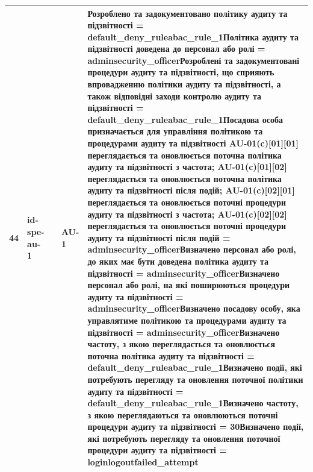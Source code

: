 \documentclass[10pt]{article}
\begin{document}
\begin{longtable}{|c|>{\raggedright\arraybackslash}p{2.5cm}|>{\raggedright\arraybackslash}p{4.5cm}|>{\raggedright\arraybackslash}p{3cm}|>{\raggedright\arraybackslash}p{4.5cm}|}
44 & id-spe-au-1 &  & AU-1 & Розроблено та задокументовано політику аудиту та підзвітності = \textbf{default\_\allowbreak{}deny\_\allowbreak{}ruleabac\_\allowbreak{}rule\_\allowbreak{}1}\newline Політика аудиту та підзвітності доведена до персонал або ролі = \textbf{adminsecurity\_\allowbreak{}officer}\newline Розроблені та задокументовані процедури аудиту та підзвітності, що сприяють впровадженню політики аудиту та підзвітності, а також відповідні заходи контролю аудиту та підзвітності = \textbf{default\_\allowbreak{}deny\_\allowbreak{}ruleabac\_\allowbreak{}rule\_\allowbreak{}1}\newline Посадова особа призначається для управління політикою та процедурами аудиту та підзвітності AU-01(c)[01][01] переглядається та оновлюється поточна політика аудиту та підзвітності з частота; AU-01(c)[01][02] переглядається та оновлюється поточна політика аудиту та підзвітності після подій; AU-01(c)[02][01] переглядається та оновлюється поточні процедури аудиту та підзвітності з частота; AU-01(c)[02][02] переглядається та оновлюється поточні процедури аудиту та підзвітності після подій = \textbf{adminsecurity\_\allowbreak{}officer}\newline Визначено персонал або ролі, до яких має бути доведена політика аудиту та підзвітності = \textbf{adminsecurity\_\allowbreak{}officer}\newline Визначено персонал або ролі, на які поширюються процедури аудиту та підзвітності = \textbf{adminsecurity\_\allowbreak{}officer}\newline Визначено посадову особу, яка управлятиме політикою та процедурами аудиту та підзвітності = \textbf{adminsecurity\_\allowbreak{}officer}\newline Визначено частоту, з якою переглядається та оновлюється поточна політика аудиту та підзвітності = \textbf{default\_\allowbreak{}deny\_\allowbreak{}ruleabac\_\allowbreak{}rule\_\allowbreak{}1}\newline Визначено події, які потребують перегляду та оновлення поточної політики аудиту та підзвітності = \textbf{default\_\allowbreak{}deny\_\allowbreak{}ruleabac\_\allowbreak{}rule\_\allowbreak{}1}\newline Визначено частоту, з якою переглядаються та оновлюються поточні процедури аудиту та підзвітності = \textbf{30}\newline Визначено події, які потребують перегляду та оновлення поточної процедури аудиту та підзвітності = \textbf{loginlogoutfailed\_\allowbreak{}attempt} \\ \hline

\end{longtable}
\end{document}
